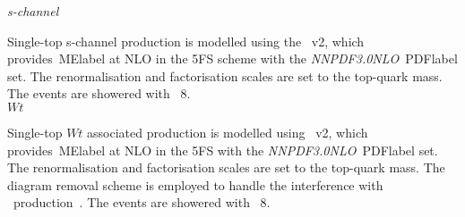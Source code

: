 \textit{s-channel}

Single-top s-channel production is modelled using the \POWHEGBOX~v2, which provides~\acrshort{MElabel} at NLO in the 5FS scheme with the \textit{NNPDF3.0NLO}~\acrshort{PDFlabel} set. The renormalisation and factorisation scales are set to the top-quark mass. The events are showered with \PYTHIA~8.\\

\textit{$Wt$}

Single-top $Wt$ associated production is modelled using \POWHEGBOX~v2, which provides~\acrshort{MElabel} at NLO in the 5FS with the \textit{NNPDF3.0NLO}~\acrshort{PDFlabel} set. The renormalisation and factorisation scales are set to the top-quark mass. The diagram removal scheme is employed to handle the interference with \ttbar\ production~\cite{ATL-PHYS-PUB-2016-020,Frixione_2008}. %
The events are showered with \PYTHIA~8.

